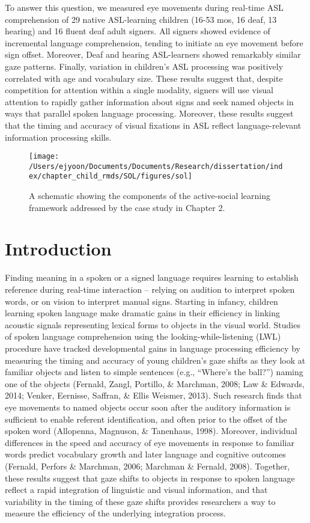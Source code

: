 \documentclass[oneside]{report}
\begin{document}
To answer this question, we measured eye movements during real-time ASL
comprehension of 29 native ASL-learning children (16-53 mos, 16 deaf, 13
hearing) and 16 fluent deaf adult signers. All signers showed evidence
of incremental language comprehension, tending to initiate an eye
movement before sign offset. Moreover, Deaf and hearing ASL-learners
showed remarkably similar gaze patterns. Finally, variation in
children's ASL processing was positively correlated with age and
vocabulary size. These results suggest that, despite competition for
attention within a single modality, signers will use visual attention to
rapidly gather information about signs and seek named objects in ways
that parallel spoken language processing. Moreover, these results
suggest that the timing and accuracy of visual fixations in ASL reflect
language-relevant information processing skills.
\begin{figure}[!t]

{\centering \texttt{[image: /Users/ejyoon/Documents/Documents/Research/dissertation/index/chapter\_child\_rmds/SOL/figures/sol]} 

}

\caption[Overview of Chapter 2.]{A schematic showing the components of the active-social learning framework addressed by the case study in Chapter 2.}\label{fig:schematic-sol}
\end{figure}
\section{Introduction}\label{introduction-1}

Finding meaning in a spoken or a signed language requires learning to
establish reference during real-time interaction -- relying on audition
to interpret spoken words, or on vision to interpret manual signs.
Starting in infancy, children learning spoken language make dramatic
gains in their efficiency in linking acoustic signals representing
lexical forms to objects in the visual world. Studies of spoken language
comprehension using the looking-while-listening (LWL) procedure have
tracked developmental gains in language processing efficiency by
measuring the timing and accuracy of young children's gaze shifts as
they look at familiar objects and listen to simple sentences (e.g.,
``Where's the ball?'') naming one of the objects (Fernald, Zangl,
Portillo, \& Marchman, 2008; Law \& Edwards, 2014; Venker, Eernisse,
Saffran, \& Ellis Weismer, 2013). Such research finds that eye movements
to named objects occur soon after the auditory information is sufficient
to enable referent identification, and often prior to the offset of the
spoken word (Allopenna, Magnuson, \& Tanenhaus, 1998). Moreover,
individual differences in the speed and accuracy of eye movements in
response to familiar words predict vocabulary growth and later language
and cognitive outcomes (Fernald, Perfors \& Marchman, 2006; Marchman \&
Fernald, 2008). Together, these results suggest that gaze shifts to
objects in response to spoken language reflect a rapid integration of
linguistic and visual information, and that variability in the timing of
these gaze shifts provides researchers a way to measure the efficiency
of the underlying integration process.
\end{document}
